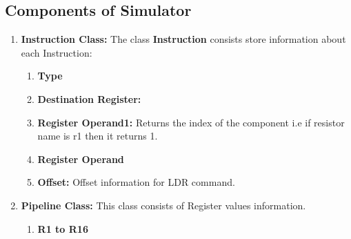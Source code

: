 \documentclass[12pt]{extarticle}
\begin{document}
\subsection{Components of Simulator}
\begin{enumerate}
\item \textbf{Instruction Class:}
The class \textbf{Instruction} consists store information about each Instruction:
\begin{enumerate}
\item \textbf{Type}
\item \textbf{Destination Register: }
\item \textbf{Register Operand1:} Returns the index of the component i.e if resistor name is r1 then it returns 1.
\item \textbf{Register Operand}
\item \textbf{Offset:} Offset information for LDR command.
\end{enumerate} 
\item \textbf{Pipeline Class:}
This class consists of Register values information.
\begin{enumerate}
\item \textbf{R1 to R16}
\end{enumerate}

\end{enumerate}
\end{document}
